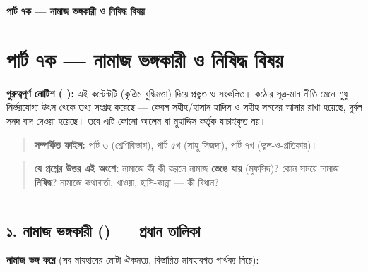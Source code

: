 

\begin{center}{\Large\bfseries\color{emerald} পার্ট ৭ক — নামাজ ভঙ্গকারী ও নিষিদ্ধ বিষয়}\end{center}
\vspace{1em}
\section*{পার্ট ৭ক — নামাজ ভঙ্গকারী ও নিষিদ্ধ বিষয়}

\begin{warnbox}
 \textbf{গুরুত্বপূর্ণ নোটিশ ( ):} এই কন্টেন্টটি  (কৃত্রিম বুদ্ধিমত্তা) দিয়ে প্রস্তুত ও সংকলিত।  কঠোর সূত্র-মান নীতি মেনে শুধু নির্ভরযোগ্য উৎস থেকে তথ্য সংগ্রহ করেছে — কেবল সহীহ/হাসান হাদিস ও সহীহ সনদের আসার রাখা হয়েছে, দুর্বল সনদ বাদ দেওয়া হয়েছে। তবে এটি কোনো আলেম বা মুহাদ্দিস কর্তৃক যাচাইকৃত নয়।
\end{warnbox}

\begin{quote}
\textbf{সম্পর্কিত ফাইল:} পার্ট ৩ (শ্রেণিবিভাগ), পার্ট ৫খ (সাহু সিজদা), পার্ট ৭খ (ভুল-ও-প্রতিকার)।
\end{quote}

\begin{quote}
\textbf{যে প্রশ্নের উত্তর এই অংশে:} নামাজে কী কী করলে নামাজ \textbf{ভেঙে যায়} (মুফসিদ)? কোন সময়ে নামাজ \textbf{নিষিদ্ধ}? নামাজে কথাবার্তা, খাওয়া, হাসি-কান্না — কী বিধান?
\end{quote}

\medskip\hrule\medskip

\subsection*{১. নামাজ ভঙ্গকারী () — প্রধান তালিকা}

\textbf{নামাজ ভঙ্গ করে} (সব মাযহাবের মোটা ঐকমত্য, বিস্তারিত মাযহাবগত পার্থক্য নিচে):


